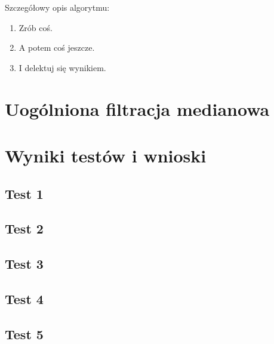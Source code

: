 \documentclass[a4paper,12pt,oneside,notitlepage,onecolumn]{article}
\begin{document}
Szczegółowy opis algorytmu:
\begin{enumerate}
 \item Zrób coś.
 \item A potem coś jeszcze.
 \item I delektuj się wynikiem.
\end{enumerate}


\section{Uogólniona filtracja medianowa}

\section{Wyniki testów i wnioski}
\subsection{Test 1}
\subsection{Test 2}
\subsection{Test 3}
\subsection{Test 4}
\subsection{Test 5}
\end{document}
